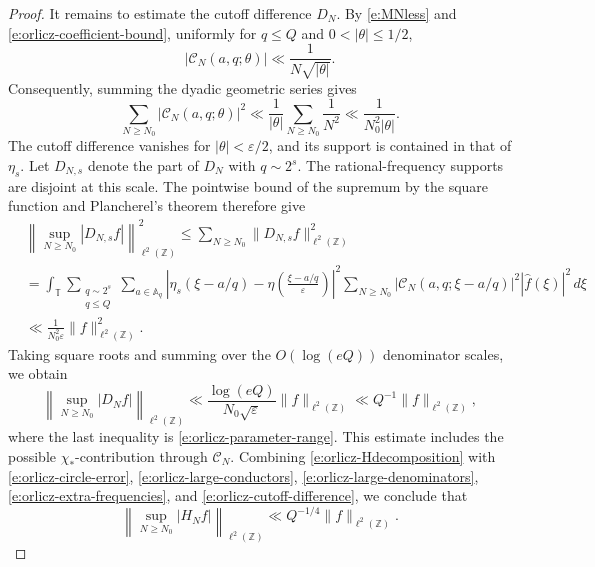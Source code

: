 \documentclass[12pt,reqno]{amsart}
\numberwithin{equation}{section}
\theoremstyle{definition}
\theoremstyle{remark}
\begin{document}
\begin{proof}
It remains to estimate the cutoff difference \(D_N\).
By \eqref{e:MNless} and
\eqref{e:orlicz-coefficient-bound}, uniformly for \(q\leq Q\)
and \(0<|\theta|\leq1/2\),
\[
 |\mathcal C_N(a,q;\theta)|
 \ll \frac1{N\sqrt{|\theta|}}.
\]
Consequently, summing the dyadic geometric series gives
\[
 \sum_{N\geq N_0}|\mathcal C_N(a,q;\theta)|^2
 \ll
 \frac1{|\theta|}\sum_{N\geq N_0}\frac1{N^2}
 \ll\frac1{N_0^2|\theta|}.
\]
The cutoff difference vanishes for
\(|\theta|<\varepsilon/2\), and its support is contained in that
of \(\eta_s\).
Let \(D_{N,s}\) denote the part of \(D_N\) with \(q\sim2^s\).
The rational-frequency supports are disjoint at this scale.
The pointwise bound of the supremum by the square function and
Plancherel's theorem therefore give
\begin{align*}
 &\left\|
 \sup_{N\geq N_0}|D_{N,s}f|
 \right\|_{\ell^2(\mathbb Z)}^2
 \leq
 \sum_{N\geq N_0}\|D_{N,s}f\|_{\ell^2(\mathbb Z)}^2\\
 &=
 \int_{\mathbb T}
 \sum_{\substack{q\sim2^s\\q\leq Q}}\sum_{a\in\mathbb A_q}
 \left|
 \eta_s(\xi-a/q)
 -
 \eta\left(\frac{\xi-a/q}{\varepsilon}\right)
 \right|^2
 \sum_{N\geq N_0}
 |\mathcal C_N(a,q;\xi-a/q)|^2
 |\widehat f(\xi)|^2\,d\xi\\
 &\ll
 \frac1{N_0^2\varepsilon}\|f\|_{\ell^2(\mathbb Z)}^2.
\end{align*}
Taking square roots and summing over the
\(O(\log(eQ))\) denominator scales, we obtain
\begin{equation}\label{e:orlicz-cutoff-difference}
 \left\|
 \sup_{N\geq N_0}|D_Nf|
 \right\|_{\ell^2(\mathbb Z)}
 \ll
 \frac{\log(eQ)}{N_0\sqrt\varepsilon}
 \|f\|_{\ell^2(\mathbb Z)}
 \ll Q^{-1}\|f\|_{\ell^2(\mathbb Z)},
\end{equation}
where the last inequality is
\eqref{e:orlicz-parameter-range}.
This estimate includes the possible \(\chi_*\)-contribution
through \(\mathcal C_N\).
Combining \eqref{e:orlicz-Hdecomposition} with
\eqref{e:orlicz-circle-error},
\eqref{e:orlicz-large-conductors},
\eqref{e:orlicz-large-denominators},
\eqref{e:orlicz-extra-frequencies}, and
\eqref{e:orlicz-cutoff-difference}, we conclude that
\[
 \left\|
 \sup_{N\geq N_0}|H_Nf|
 \right\|_{\ell^2(\mathbb Z)}
 \ll Q^{-1/4}\|f\|_{\ell^2(\mathbb Z)}.
\]

\medskip


\end{proof}
\end{document}
